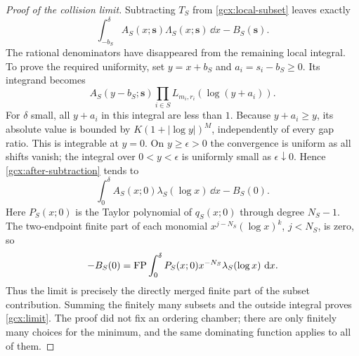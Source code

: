\begin{proof}[Proof of the collision limit]
Subtracting $T_S$ from \eqref{gcx:local-subset} leaves exactly
\begin{equation}\label{gcx:after-subtraction}
 \int_{-b_S}^{\delta}A_S(x;\boldsymbol s)
                \Lambda_S(x;\boldsymbol s)\,\dd x-B_S(\boldsymbol s).
\end{equation}
The rational denominators have disappeared from the remaining local
integral.  To prove the required uniformity, set $y=x+b_S$ and
$a_i=s_i-b_S\ge0$.  Its integrand becomes
\[
 A_S(y-b_S;\boldsymbol s)
       \prod_{i\in S}L_{m_i,r_i}(\log(y+a_i)).
\]
For $\delta$ small, all $y+a_i$ in this integral are less than $1$.
Because $y+a_i\ge y$, its absolute value is bounded by
$K(1+|\log y|)^M$, independently of every gap ratio.  This is integrable
at $y=0$.  On $y\ge\epsilon>0$ the convergence is uniform as all shifts
vanish; the integral over $0<y<\epsilon$ is uniformly small as
$\epsilon\downarrow0$.  Hence \eqref{gcx:after-subtraction} tends to
\[
 \int_0^\delta A_S(x;0)\lambda_S(\log x)\,\dd x-B_S(0).
\]
Here $P_S(x;0)$ is the Taylor polynomial of $q_S(x;0)$ through degree
$N_S-1$.  The two-endpoint finite part of each monomial
$x^{j-N_S}(\log x)^k$, $j<N_S$, is zero, so
\[
 -B_S(0)=\operatorname{FP}\int_0^\delta
          P_S(x;0)x^{-N_S}\lambda_S(\log x)\,\,\mathrm d x.
\]
Thus the limit is precisely the directly merged finite part of the
subset contribution.  Summing the finitely many subsets and the outside
integral proves \eqref{gcx:limit}.  The proof did not fix an ordering
chamber; there are only finitely many choices for the minimum, and the
same dominating function applies to all of them.
\end{proof}

